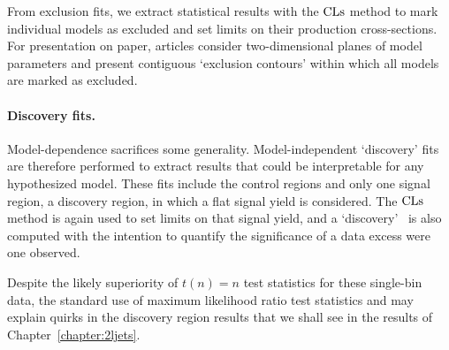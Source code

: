From exclusion fits, we extract statistical results with the $\mathrm{CLs}$ method to
mark individual models as excluded and set limits on their production
cross-sections.
For presentation on paper, articles consider two-dimensional planes of model
parameters and present contiguous `exclusion contours' within which all models
are marked as excluded.

\paragraph{Discovery fits.}
Model-dependence sacrifices some generality.
Model-independent `discovery' fits are therefore performed to extract results
that could be interpretable for any hypothesized model.
These fits include the control regions and only one signal region, a
discovery region, in which a flat signal yield is considered.
The $\mathrm{CLs}$ method is again used to set limits on that signal yield,
and a `discovery' \pvalue\ is also computed with the intention to quantify
the significance of a data excess were one observed.

Despite the likely superiority of $t(n) = n$ test statistics for these
single-bin data, the standard use of maximum likelihood ratio test statistics
and may explain quirks in the discovery region results that we shall see in the
results of Chapter~\ref{chapter:2ljets}.

